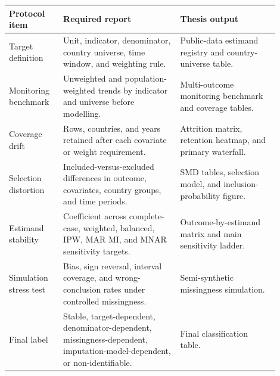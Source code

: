 \begin{tabular}{p{0.18\linewidth}p{0.39\linewidth}p{0.33\linewidth}}
\toprule
Protocol item & Required report & Thesis output \\
\midrule
Target definition & Unit, indicator, denominator, country universe, time window, and weighting rule. & Public-data estimand registry and country-universe table. \\
Monitoring benchmark & Unweighted and population-weighted trends by indicator and universe before modelling. & Multi-outcome monitoring benchmark and coverage tables. \\
Coverage drift & Rows, countries, and years retained after each covariate or weight requirement. & Attrition matrix, retention heatmap, and primary waterfall. \\
Selection distortion & Included-versus-excluded differences in outcome, covariates, country groups, and time periods. & SMD tables, selection model, and inclusion-probability figure. \\
Estimand stability & Coefficient across complete-case, weighted, balanced, IPW, MAR MI, and MNAR sensitivity targets. & Outcome-by-estimand matrix and main sensitivity ladder. \\
Simulation stress test & Bias, sign reversal, interval coverage, and wrong-conclusion rates under controlled missingness. & Semi-synthetic missingness simulation. \\
Final label & Stable, target-dependent, denominator-dependent, missingness-dependent, imputation-model-dependent, or non-identifiable. & Final classification table. \\
\bottomrule
\end{tabular}
